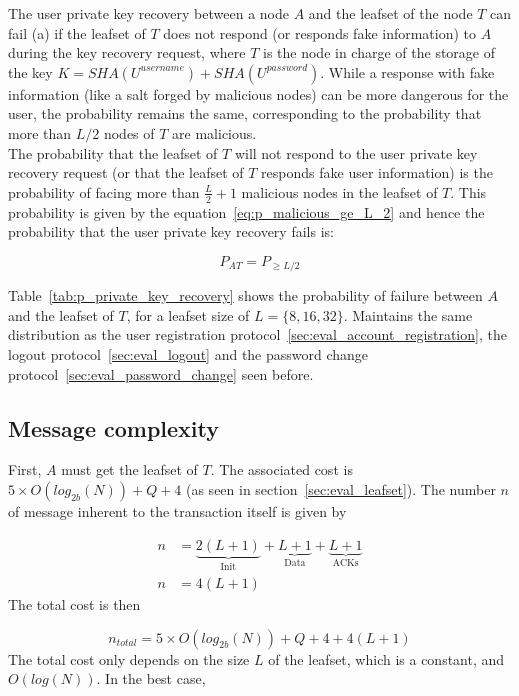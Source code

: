    The user private key recovery between a node $A$ and the leafset of the
node $T$ can fail (a) if the leafset of $T$ does
not respond (or responds fake information) to $A$ during the key recovery
request, where $T$ is the node in charge of the storage of the key $K=
SHA(U^{username}) + SHA(U^{password})$. While a response with fake information (like a salt forged by malicious nodes) can be more dangerous for the
user, the probability remains the same, corresponding to the
probability that more than $L/2$ nodes of $T$ are malicious.\\
    The probability that the leafset of $T$ will not respond to the user private key recovery
request (or that the leafset of $T$ responds fake user information) is the probability of
facing more than $\frac{L}{2} +1$ malicious nodes in the leafset of $T$. This probability is given by the
equation~\ref{eq:p_malicious_ge_L_2} and hence the probability that the user
private key recovery fails is:

\begin{equation} \label{eq:L_2_malicious_A_I}
 P_{AT} = P_{\ge L/2}
\end{equation}

    Table~\eqref{tab:p_private_key_recovery} shows the probability of failure
between $A$ and the leafset of $T$, for a leafset size of $L = \{8,16,32\}$.
Maintains the same distribution as the user registration
protocol~\ref{sec:eval_account_registration}, the
logout protocol~\ref{sec:eval_logout} and the password change
protocol~\ref{sec:eval_password_change} seen before.

    
  \subsection{Message complexity}
    First, $A$ must get the leafset of $T$. The associated cost is $5
\times O(log_{2b}(N)) + Q + 4$ (as seen in section~\ref{sec:eval_leafset}).
    The number $n$ of message inherent to the transaction itself is given by

    \begin{align}
      n &= \underbrace{2(L+1)}_\text{Init} + \underbrace{L+1}_\text{Data} +  \underbrace{L+1}_\text{ACKs}\\
      n &= 4(L+1)
    \end{align}
     The total cost is then

    $$
      n_{total} = 5 \times O(log_{2b}(N)) + Q + 4 + 4(L+1)
    $$    
    The total cost only depends on the size $L$ of the leafset, which is a
constant, and $O(log(N))$. In the best case, 

